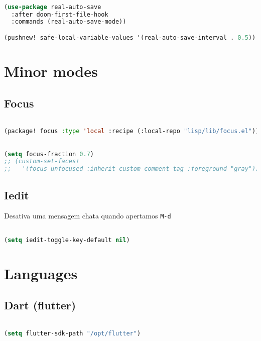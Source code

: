 \documentclass[11pt]{article}
\begin{document}
\begin{lstlisting}[language=Lisp]%! Someone please complete this list for me

(use-package real-auto-save
  :after doom-first-file-hook
  :commands (real-auto-save-mode))

(pushnew! safe-local-variable-values '(real-auto-save-interval . 0.5))
\end{lstlisting}


\section{Minor modes}
\label{sec:minor-modes}


\subsection{Focus}
\label{sec:focus}
\begin{lstlisting}[language=Lisp]%! Someone please complete this list for me

(package! focus :type 'local :recipe (:local-repo "lisp/lib/focus.el"))
\end{lstlisting}

\begin{lstlisting}[language=Lisp]%! Someone please complete this list for me

(setq focus-fraction 0.7)
;; (custom-set-faces!
;;   '(focus-unfocused :inherit custom-comment-tag :foreground "gray"))
\end{lstlisting}

\subsection{Iedit}
\label{sec:iedit}
Desativa uma mensagem chata quando apertamos \texttt{M-d}

\begin{lstlisting}[language=Lisp]%! Someone please complete this list for me

(setq iedit-toggle-key-default nil)
\end{lstlisting}


\section{Languages}
\label{sec:languages}


\subsection{Dart (flutter)}
\label{sec:dart-flutter}
\begin{lstlisting}[language=Lisp]%! Someone please complete this list for me

(setq flutter-sdk-path "/opt/flutter")
\end{lstlisting}
\end{document}
